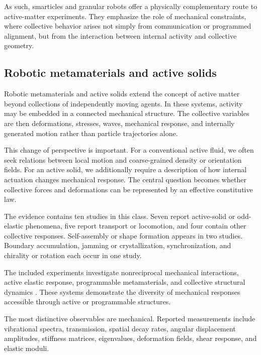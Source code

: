 As such, smarticles and
granular robots offer
a physically complementary
route to active-matter
experiments. They emphasize
the role of mechanical
constraints, where collective
behavior arises not simply
from communication or
programmed alignment,
but from the interaction
between internal activity
and collective geometry.

\subsection{Robotic metamaterials and active solids}
\label{sec:platforms-active-solids}

Robotic metamaterials and active solids extend the
concept of active matter beyond collections of
independently moving agents. In these systems,
activity may be embedded in a connected mechanical
structure. The collective variables are then
deformations, stresses, waves, mechanical response,
and internally generated motion rather than
particle trajectories alone.

This change of perspective is important.
For a conventional active fluid, we often seek
relations between local motion and coarse-grained
density or orientation fields. For an active
solid, we additionally require a description
of how internal actuation changes mechanical
response. The central question becomes
whether collective forces and deformations
can be represented by an effective
constitutive law.

The evidence contains ten studies in this class.
Seven report active-solid or odd-elastic
phenomena, five report transport or locomotion,
and four contain other collective responses.
Self-assembly or shape formation appears
in two studies. Boundary accumulation,
jamming or crystallization, synchronization,
and chirality or rotation each occur
in one study.

The included experiments investigate
nonreciprocal mechanical interactions,
active elastic response, programmable
metamaterials, and collective structural
dynamics
\cite{Baconnier2022tensioncontrolledc,Zhang2026noiseenhancedtempo,Rezanejad2025programmableentangl,Elshalakani2020simulationofselfc,Brandenbourger2019nonreciprocalrobot,Du2026metamaterialsthatl,Brandenbourger2021limitcyclesturnac,Binysh2026moreislessinunpe,Coulais2025activemetamaterials,Chen2020selfsensingmetamat}.
These systems demonstrate the diversity
of mechanical responses accessible
through active or programmable structures.

The most distinctive observables are
mechanical. Reported measurements
include vibrational spectra,
transmission, spatial decay rates,
angular displacement amplitudes,
stiffness matrices, eigenvalues,
deformation fields, shear response,
and elastic moduli.

